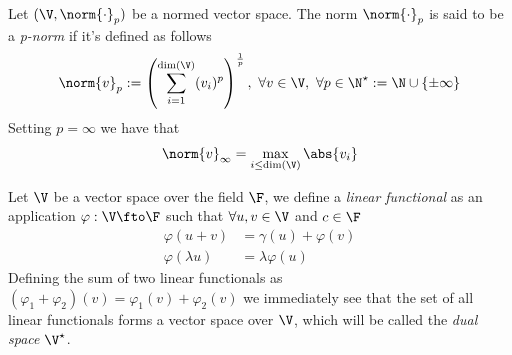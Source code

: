 \documentclass[../mmf.tex]{subfiles}
\begin{document}
\begin{dfn}[p-norm]
	Let $(\V,\norm{\cdot}_p)$ be a normed vector space. The norm $\norm{\cdot}_p$ is said to be a \textit{p-norm} if it's defined as follows
	\begin{equation}
		\norm{v}_p:=\left( \sum_{i=1}^{\dim(\V)}(v_i)^p \right)^{\frac{1}{p}},\ \forall v\in\V,\ \forall p\in\N^{\star}:=\N\cup\{\pm\infty\}
		\label{eq:pnorm}
	\end{equation}
	Setting $p=\infty$ we have that
	\begin{equation}
		\norm{v}_{\infty}=\max_{i\le\dim(\V)}\abs{v_i}
		\label{eq:inftynorm}
	\end{equation}
\end{dfn}
\begin{dfn}
	Let $\V$ be a vector space over the field $\F$, we define a \textit{linear functional} as an application $\varphi:\V\fto\F$ such that $\forall u,v\in\V$ and $c\in\F$
	\begin{equation}
		\begin{aligned}
			\varphi(u+v)&=\gamma(u)+\varphi(v)\\
			\varphi(\lambda u)&=\lambda\varphi(u)
		\end{aligned}
		\label{eq:linearfunctional}
	\end{equation}
	Defining the sum of two linear functionals as $(\varphi_1+\varphi_2)(v)=\varphi_1(v)+\varphi_2(v)$ we immediately see that the set of all linear functionals forms a vector space over $\V$, which will be called the \textit{dual space} $\V^\star$.
\end{dfn}
\end{document}
